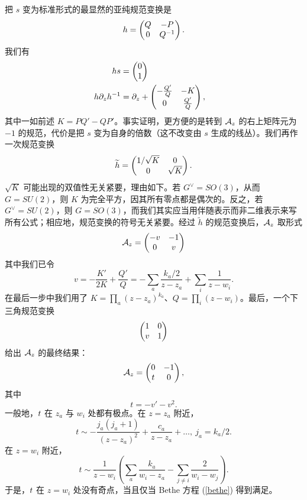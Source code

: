 把 $s$ 变为标准形式的最显然的亚纯规范变换是
\begin{equation}\label{helm} h=\begin{pmatrix}Q & -P\cr 0 & Q^{-1}\end{pmatrix}.\end{equation}
我们有
\begin{align}\label{elm}  hs& = \begin{pmatrix}0 \cr 1\end{pmatrix} \cr
          h\partial_z h^{-1} & = \partial_z+
          \begin{pmatrix} -\frac{Q'}{Q} & -K  \cr 0 & \frac{Q'}{Q}\end{pmatrix},\end{align}
其中一如前述 $K=PQ'-QP'$。事实证明，更方便的是转到 $\A_z$ 的右上矩阵元为 $-1$ 的规范，代价是把 $s$ 变为自身的倍数（这不改变由 $s$ 生成的线丛）。我们再作一次规范变换
\begin{equation}\label{furth}\tilde h=
\begin{pmatrix}1/\sqrt{K} & 0 \cr 0 & \sqrt{K}\end{pmatrix}.\end{equation}
$\sqrt{K}$ 可能出现的双值性无关紧要，理由如下。若 $G^\vee=SO(3)$，从而 $G=SU(2)$，则 $K$ 为完全平方，因其所有零点都是偶次的。反之，若 $G^\vee=SU(2)$，则 $G=SO(3)$，而我们其实应当用伴随表示而非二维表示来写所有公式；相应地，规范变换的符号无关紧要。经过 $\tilde h$ 的规范变换后，$\A_z$ 取形式
\begin{equation}\label{omogro}\A_z=
\begin{pmatrix} -v & -1\cr 0 & v \cr\end{pmatrix}\end{equation}
其中我们已令
\begin{equation}\label{tomogro}v=-\frac{ K'}{2K}+\frac{Q'}{Q}=-\sum_a \frac{ k_a/2}
{z-z_a}+\sum_i\frac{1}{z-w_i}.\end{equation}
在最后一步中我们用了 $K=\prod_a (z-z_a)^{k_a}$、$Q=\prod_i(z-w_i)$。最后，一个下三角规范变换
\begin{equation}\label{morgo} \begin{pmatrix} 1 & 0 \cr v & 1\end{pmatrix}\end{equation}
给出 $\A_z$ 的最终结果：
\begin{equation}\label{torog} \A_z=\begin{pmatrix} 0 & -1 \cr \bt & 0 \end{pmatrix},\end{equation}
其中
\begin{equation}\label{orog} t= -v'-v^2.\end{equation}
一般地，$\bt$ 在 $z_a$ 与 $w_i$ 处都有极点。在 $z=z_a$ 附近，
\begin{equation}\label{roog}t\sim-\frac{ j_a(j_a+1)}{(z-z_a)^2}+\frac{c_a}{z-z_a}+\dots, ~ j_a=k_a/2.\end{equation}
在 $z=w_i$ 附近，
\begin{equation}\label{frog}t\sim  \frac{1}{z-w_i}
\left(\sum_a\frac{k_a}{w_i-z_a}-\sum_{j\not=i}\frac{2}{w_i-w_j}\right).\end{equation}
于是，$\bt$ 在 $z=w_i$ 处没有奇点，当且仅当 Bethe 方程 (\ref{bethe}) 得到满足。

